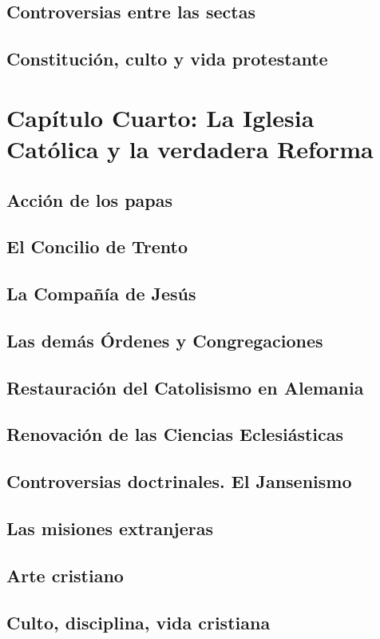 \raggedbottom{} \documentclass[12pt, a4paper]{book}
\begin{document}
\section{Controversias entre las sectas}
\section{Constitución, culto y vida protestante}
\chapter{Capítulo Cuarto: La Iglesia Católica y la verdadera Reforma}
\section{Acción de los papas}
\section{El Concilio de Trento}
\section{La Compañía de Jesús}
\section{Las demás Órdenes y Congregaciones}
\section{Restauración del Catolisismo en Alemania}
\section{Renovación de las Ciencias Eclesiásticas}
\section{Controversias doctrinales. El Jansenismo}
\section{Las misiones extranjeras}
\section{Arte cristiano}
\section{Culto, disciplina, vida cristiana}
\end{document}
